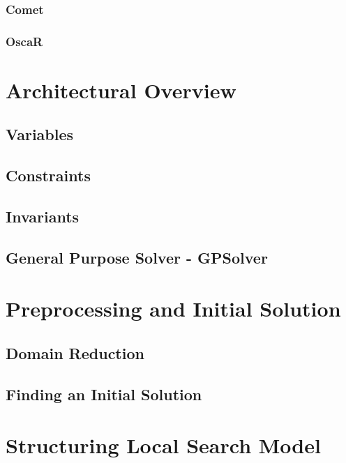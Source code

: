 \documentclass[a4paper,11pt]{article}
\begin{document}
    \subsubsection{Comet}
    
    \subsubsection{OscaR}
    
 
\newpage
\section{Architectural Overview}  
  
  \subsection{Variables}
  
  \subsection{Constraints}
   \label{sub_cons}
    \subsection{Invariants}
  \label{sub_inv}

  \subsection{General Purpose Solver - GPSolver}
  \label{sub_gen}
  
\newpage
\section{Preprocessing and Initial Solution} \label{sec_gecode}
  
  \subsection{Domain Reduction}
  
  \subsection{Finding an Initial Solution}
   \label{sub_inisol}

\newpage
\section{Structuring Local Search Model} \label{sec_ls}

\end{document}
